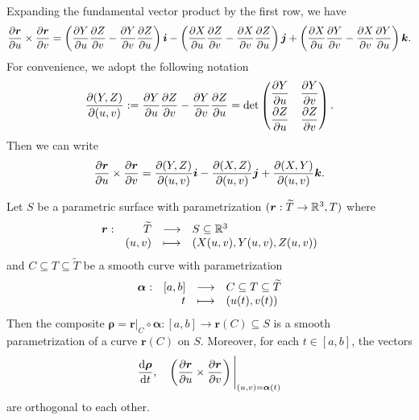 \begin{notationenv}
    Expanding the fundamental vector product by the first row, we have
    $$ \pdv{\bm r}{u}\times \pdv{\bm r}{v} = \left( \dfrac{\partial Y}{\partial u} \dfrac{\partial Z}{\partial v} - \dfrac{\partial Y}{\partial v} \dfrac{\partial Z}{\partial u} \right) \bm i - \left( \dfrac{\partial X}{\partial u} \dfrac{\partial Z}{\partial v} - \dfrac{\partial X}{\partial v} \dfrac{\partial Z}{\partial u} \right) \bm j + \left( \dfrac{\partial X}{\partial u} \dfrac{\partial Y}{\partial v} - \dfrac{\partial X}{\partial v} \dfrac{\partial Y}{\partial u} \right) \bm k. $$
    For convenience, we adopt the following notation
    $$ \frac{\partial\!\left(Y,Z\right)}{\partial\!\left(u,v\right)} := \dfrac{\partial Y}{\partial u} \dfrac{\partial Z}{\partial v} - \dfrac{\partial Y}{\partial v} \dfrac{\partial Z}{\partial u} = \det \begin{pmatrix}
        \dfrac{\partial Y}{\partial u} & \dfrac{\partial Y}{\partial v}\\[6pt]
        \dfrac{\partial Z}{\partial u} & \dfrac{\partial Z}{\partial v} 
    \end{pmatrix}.$$
    Then we can write
    $$ \pdv{\bm r}{u}\times \pdv{\bm r}{v} = \frac{\partial\!\left(Y,Z\right)}{\partial\!\left(u,v\right)} \bm i - \frac{\partial\!\left(X,Z\right)}{\partial\!\left(u,v\right)} \bm j + \frac{\partial\!\left(X,Y\right)}{\partial\!\left(u,v\right)} \bm k. $$
\end{notationenv}
\begin{propositionenv}\label{prop: fundamental vector product is normal to the surface}
    Let $S$ be a parametric surface with parametrization $(\bm r: \widetilde T \to \mathbb{R}^3, T)$ where
    $$\begin{array}{r r c l}
        \bm r: & \widetilde T & \longrightarrow & S \subseteq \mathbb{R}^3 \\
        & (u,v) & \longmapsto & \left( X(u,v), Y(u,v), Z(u,v) \right)
    \end{array}$$
    and $C\subseteq T \subseteq \widetilde T$ be a smooth curve with parametrization $$ \begin{array}{r r c l}
        \bm \alpha: & [a,b] & \longrightarrow & C \subseteq T \subseteq \widetilde T \\
        & t & \longmapsto & (u(t), v(t))
    \end{array}
    $$
    Then the composite $\bm \rho = \bm r\big|_C \circ \bm \alpha : [a,b]\to \bm r(C) \subseteq S$ is a smooth parametrization of a curve $\bm r(C)$ on $S$. Moreover, for each $t\in [a,b]$, the vectors
    $$ \dv{\bm \rho}{t},\quad \left( \pdv{\bm r}{u}\times \pdv{\bm r}{v} \right)\Bigg|_{(u,v)=\bm \alpha(t)}$$
    are orthogonal to each other.
\end{propositionenv}

